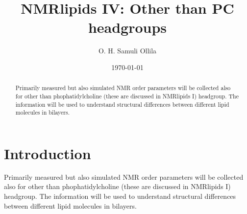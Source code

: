 \documentclass[aps,prl,superscriptaddress,twocolumn]{revtex4}
\begin{document}

\title{NMRlipids IV: Other than PC headgroups} %



\author{O. H. Samuli Ollila}



\date{\today}

\begin{abstract}
  Primarily measured but also simulated NMR order parameters will be collected also for other than phophatidylcholine
  (these are discussed in NMRlipids I) headgroup. The information will be used to understand structural differences between different lipid molecules in bilayers.
\end{abstract}


\maketitle %



\section{Introduction}
Primarily measured but also simulated NMR order parameters will be collected also for other than phophatidylcholine (these are discussed in NMRlipids I) headgroup. The information will be used to understand structural differences between different lipid molecules in bilayers.
\end{document}
